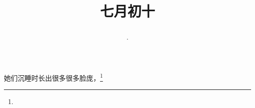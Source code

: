 \title{\date[d=13,m=8,y=2024][year:cn-y,年,month:cn,day:cn,日,·,weekday]·七月初十 }
她们沉睡时长出很多很多脸庞，\footnote{ }

